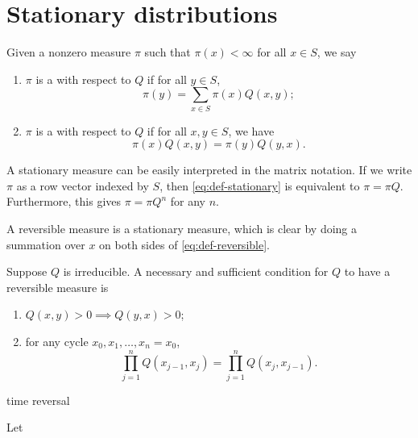 \documentclass[10pt]{book}
\begin{document}
\section{Stationary distributions}
\begin{defn}
    Given a nonzero measure $\pi$ such that $\pi(x) < \infty$ for all $x \in S$, we say \begin{enumerate}
        \item $\pi$ is a  with respect to $Q$ if for all $y \in S$, \begin{equation}
            \pi(y) = \sum_{x\in S} \pi(x)Q(x,y); \label{eq:def-stationary}
        \end{equation}
        \item $\pi$ is a  with respect to $Q$ if for all $x, y \in S$, we have \begin{equation}
            \pi(x)Q(x,y) = \pi(y)Q(y,x). \label{eq:def-reversible}
        \end{equation}
    \end{enumerate}
\end{defn}

A stationary measure can be easily interpreted in the matrix notation. If we write $\pi$ as a row vector indexed by $S$, then \eqref{eq:def-stationary} is equivalent to $\pi = \pi Q$. Furthermore, this gives $\pi = \pi Q^n$ for any $n$.

\begin{fact}
    A reversible measure is a stationary measure, which is clear by doing a summation over $x$ on both sides of \eqref{eq:def-reversible}.
\end{fact}

\begin{namedthm}
    Suppose $Q$ is irreducible. A necessary and sufficient condition for $Q$ to have a reversible measure is \begin{enumerate}
        \item $Q(x,y) > 0 \implies Q(y,x) > 0$;
        \item for any cycle $x_0,x_1,\dotsc,x_n = x_0$, \[
            \prod_{j=1}^n Q(x_{j-1},x_j) = \prod_{j=1}^nQ(x_j,x_{j-1}).
        \]
    \end{enumerate}
\end{namedthm}


time reversal

\begin{prop}
    Let 
\end{prop}
\end{document}
